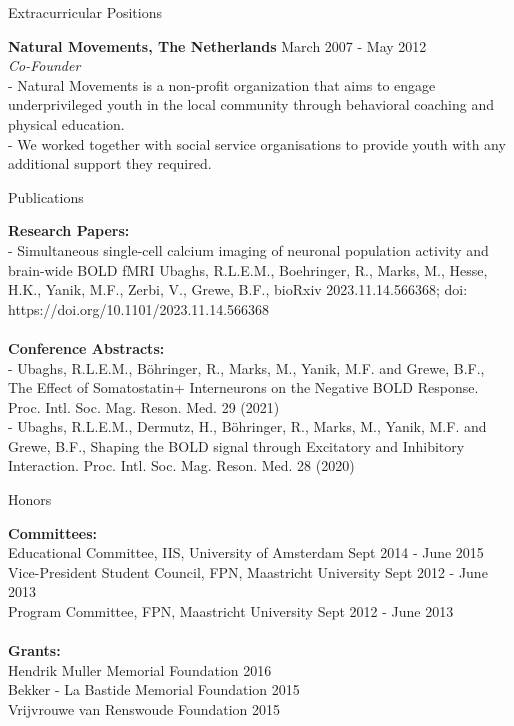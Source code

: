 \documentclass{resume}
\begin{document}
\begin{sections}{Extracurricular Positions}

{\bf Natural Movements, The Netherlands} \hfill {March 2007 - May 2012} 
\\{\textit{Co-Founder}}
\\- Natural Movements is a non-profit organization that aims to engage underprivileged youth in the local community through behavioral coaching and physical education.
\\- We worked together with social service organisations to provide youth with any additional support they required.

\end{sections}

\begin{sections}{Publications}

{\bf Research Papers:}
\\
{- Simultaneous single-cell calcium imaging of neuronal population activity and brain-wide BOLD fMRI
Ubaghs, R.L.E.M., Boehringer, R., Marks, M., Hesse, H.K., Yanik, M.F., Zerbi, V., Grewe, B.F., bioRxiv 2023.11.14.566368; doi: https://doi.org/10.1101/2023.11.14.566368}
\\
\\
{\bf Conference Abstracts:}
\\{- Ubaghs, R.L.E.M., Böhringer, R., Marks, M., Yanik, M.F. and Grewe, B.F., The Effect of Somatostatin+ Interneurons on the Negative BOLD Response. Proc. Intl. Soc. Mag. Reson. Med. 29 (2021)}
\\{- Ubaghs, R.L.E.M., Dermutz, H., Böhringer, R., Marks, M., Yanik, M.F. and Grewe, B.F., Shaping the BOLD signal through Excitatory and Inhibitory Interaction. Proc. Intl. Soc. Mag. Reson. Med. 28 (2020)}

\end{sections}

\begin{sections}{Honors}

{\bf Committees:}
\\
{Educational Committee, IIS, University of Amsterdam} \hfill {Sept 2014 - June 2015} 
\\
{Vice-President Student Council, FPN, Maastricht University} \hfill {Sept 2012 - June 2013} 
\\
{Program Committee, FPN, Maastricht University} \hfill {Sept 2012 - June 2013}
\\
\\
{\bf Grants:}
\\
{Hendrik Muller Memorial Foundation} \hfill {2016}
\\
{Bekker - La Bastide Memorial Foundation} \hfill {2015}
\\
{Vrijvrouwe van Renswoude Foundation} \hfill {2015}

\end{sections}
\end{document}
